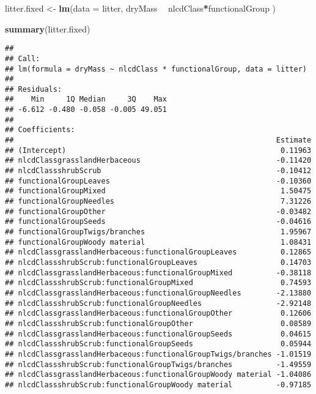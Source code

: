 \documentclass[]{article}
\newenvironment{Shaded}{\begin{snugshade}}{\end{snugshade}}
\newcommand{\DataTypeTok}[1]{\textcolor[rgb]{0.13,0.29,0.53}{#1}}
\newcommand{\KeywordTok}[1]{\textcolor[rgb]{0.13,0.29,0.53}{\textbf{#1}}}
\newcommand{\NormalTok}[1]{#1}
\newcommand{\OperatorTok}[1]{\textcolor[rgb]{0.81,0.36,0.00}{\textbf{#1}}}
\newcommand{\StringTok}[1]{\textcolor[rgb]{0.31,0.60,0.02}{#1}}
\begin{document}
\begin{Shaded}
\begin{Highlighting}[]
\NormalTok{litter.fixed <-}\StringTok{ }\KeywordTok{lm}\NormalTok{(}\DataTypeTok{data =}\NormalTok{ litter,}
\NormalTok{                      dryMass }\OperatorTok{~}\StringTok{ }\NormalTok{nlcdClass}\OperatorTok{*}\NormalTok{functionalGroup )}

\KeywordTok{summary}\NormalTok{(litter.fixed)}
\end{Highlighting}
\end{Shaded}

\begin{verbatim}
## 
## Call:
## lm(formula = dryMass ~ nlcdClass * functionalGroup, data = litter)
## 
## Residuals:
##    Min     1Q Median     3Q    Max 
## -6.612 -0.480 -0.058 -0.005 49.051 
## 
## Coefficients:
##                                                            Estimate
## (Intercept)                                                 0.11963
## nlcdClassgrasslandHerbaceous                               -0.11420
## nlcdClassshrubScrub                                        -0.10412
## functionalGroupLeaves                                      -0.10360
## functionalGroupMixed                                        1.50475
## functionalGroupNeedles                                      7.31226
## functionalGroupOther                                       -0.03482
## functionalGroupSeeds                                       -0.04616
## functionalGroupTwigs/branches                               1.95967
## functionalGroupWoody material                               1.08431
## nlcdClassgrasslandHerbaceous:functionalGroupLeaves          0.12865
## nlcdClassshrubScrub:functionalGroupLeaves                   0.14703
## nlcdClassgrasslandHerbaceous:functionalGroupMixed          -0.38118
## nlcdClassshrubScrub:functionalGroupMixed                    0.74593
## nlcdClassgrasslandHerbaceous:functionalGroupNeedles        -2.13880
## nlcdClassshrubScrub:functionalGroupNeedles                 -2.92148
## nlcdClassgrasslandHerbaceous:functionalGroupOther           0.12606
## nlcdClassshrubScrub:functionalGroupOther                    0.08589
## nlcdClassgrasslandHerbaceous:functionalGroupSeeds           0.04615
## nlcdClassshrubScrub:functionalGroupSeeds                    0.05944
## nlcdClassgrasslandHerbaceous:functionalGroupTwigs/branches -1.01519
## nlcdClassshrubScrub:functionalGroupTwigs/branches          -1.49559
## nlcdClassgrasslandHerbaceous:functionalGroupWoody material -1.04086
## nlcdClassshrubScrub:functionalGroupWoody material          -0.97185

\end{verbatim}
\end{document}
